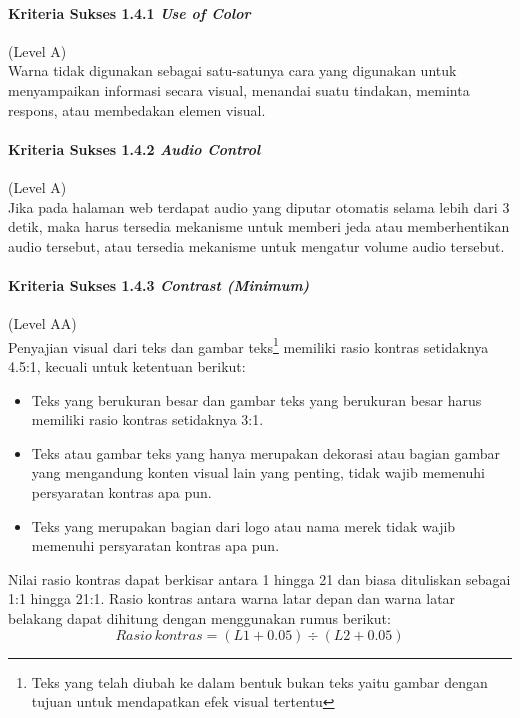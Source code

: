 \paragraph{Kriteria Sukses 1.4.1 \textit{Use of Color}}
\label{sec:kriteria_sukses_1.4.1}
(Level A)\\

Warna tidak digunakan sebagai satu-satunya cara yang digunakan untuk menyampaikan informasi secara visual, menandai suatu tindakan, meminta respons, atau membedakan elemen visual.

\paragraph{Kriteria Sukses 1.4.2 \textit{Audio Control}}
\label{sec:kriteria_sukses_1.4.2}
(Level A)\\

Jika pada halaman web terdapat audio yang diputar otomatis selama lebih dari 3 detik, maka harus tersedia mekanisme untuk memberi jeda atau memberhentikan audio tersebut, atau tersedia mekanisme untuk mengatur volume audio tersebut.

\paragraph{Kriteria Sukses 1.4.3 \textit{Contrast (Minimum)}}
\label{sec:kriteria_sukses_1.4.3}
(Level AA)\\

Penyajian visual dari teks dan gambar teks\footnote{Teks yang telah diubah ke dalam bentuk bukan teks yaitu gambar dengan tujuan untuk mendapatkan efek visual tertentu} memiliki rasio kontras setidaknya 4.5:1, kecuali untuk ketentuan berikut:

\begin{itemize}
	\item Teks yang berukuran besar dan gambar teks yang berukuran besar harus memiliki rasio kontras setidaknya 3:1.
	\item Teks atau gambar teks yang hanya merupakan dekorasi atau bagian gambar yang mengandung konten visual lain yang penting, tidak wajib memenuhi persyaratan kontras apa pun.
	\item Teks yang merupakan bagian dari logo atau nama merek tidak wajib memenuhi persyaratan kontras apa pun.
\end{itemize}

Nilai rasio kontras dapat berkisar antara 1 hingga 21 dan biasa dituliskan sebagai 1:1 hingga 21:1. Rasio kontras antara warna latar depan dan warna latar belakang dapat dihitung dengan menggunakan rumus berikut:
\[
	Rasio\ kontras = (L1 + 0.05) \div (L2 + 0.05)	
\]

